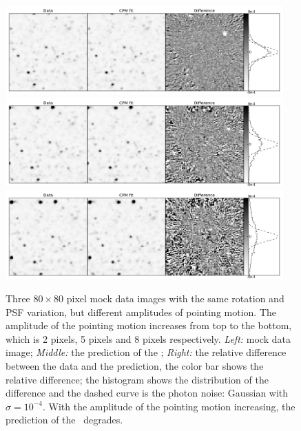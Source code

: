 \begin{figure}[p]
\begin{center}
\includegraphics[width=0.95\textwidth]{figures/cdi/f7a}
\includegraphics[width=0.95\textwidth]{figures/cdi/f7b}
\includegraphics[width=0.95\textwidth]{figures/cdi/f7c}
\end{center}
\caption{
  \label{large_motion}
  Three $80\times 80$ pixel mock data images with the same rotation and PSF variation, but different amplitudes of pointing motion. The amplitude of the pointing motion increases from top to the bottom, which is 2 pixels, 5 pixels and 8 pixels respectively. 
  \emph{Left:} mock data image;
  \emph{Middle:} the prediction of the \cpmdiff;
  \emph{Right:} the relative difference between the data and the prediction, the color bar shows the relative difference; the histogram shows the distribution of the difference and the dashed curve is the photon noise: Gaussian with $\sigma = 10^{-4}$. 
  With the amplitude of the pointing motion increasing, the prediction of the \cpmdiff\ degrades.
}
\end{figure}

